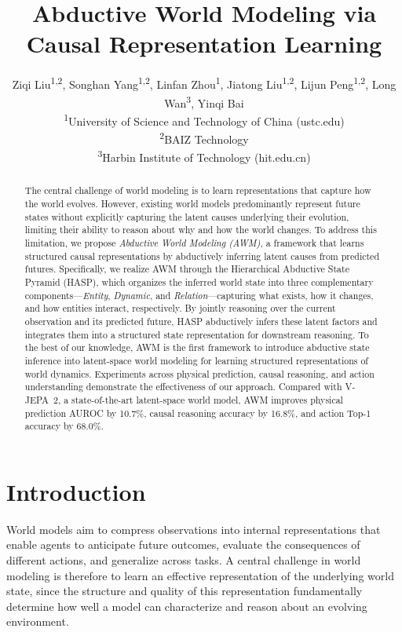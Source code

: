 \documentclass{article}
\title{Abductive World Modeling via Causal Representation Learning}
\author{%
  Ziqi Liu\textsuperscript{1,2},
  Songhan Yang\textsuperscript{1,2},
  Linfan Zhou\textsuperscript{1},
  Jiatong Liu\textsuperscript{1,2},
  Lijun Peng\textsuperscript{1,2},
  Long Wan\textsuperscript{3},
  Yinqi Bai\\[2pt]
  \normalfont\small\textsuperscript{1}University of Science and Technology of China (ustc.edu)\\
  \normalfont\small\textsuperscript{2}BAIZ Technology\\
  \normalfont\small\textsuperscript{3}Harbin Institute of Technology (hit.edu.cn)
}
\newcommand{\vjepa}{V-JEPA~2}
\begin{document}
\maketitle

\begin{abstract}
The central challenge of world modeling is to learn representations that capture how the world evolves. However, existing world models predominantly represent future states without explicitly capturing the latent causes underlying their evolution, limiting their ability to reason about why and how the world changes. 
To address this limitation, we propose \textit{Abductive World Modeling (AWM)}, a framework that learns structured causal representations by abductively inferring latent causes from predicted futures.
Specifically, we realize AWM through the Hierarchical Abductive State Pyramid (HASP), which organizes the inferred world state into three complementary components---\textit{Entity}, \textit{Dynamic}, and \textit{Relation}---capturing what exists, how it changes, and how entities interact, respectively.
By jointly reasoning over the current observation and its predicted future, HASP abductively infers these latent factors and integrates them into a structured state representation for downstream reasoning.
To the best of our knowledge, AWM is the first framework to introduce abductive state inference into latent-space world modeling for learning structured representations of world dynamics. Experiments across physical prediction, causal reasoning, and action understanding demonstrate the effectiveness of our approach. Compared with \vjepa{}, a state-of-the-art latent-space world model, AWM improves physical prediction AUROC by 10.7\%, causal reasoning accuracy by 16.8\%, and action Top-1 accuracy by 68.0\%.
\end{abstract}

\section{Introduction}

World models aim to compress observations into internal representations that enable agents to anticipate future outcomes, evaluate the consequences of different actions, and generalize across tasks\citep{ha2018worldmodels,hafner2019planet,hafner2020dreamer,
hafner2023dreamerv3,assran2025vjepa2}.
A central challenge in world modeling is therefore to learn an effective representation of the underlying world state, since the structure and quality of this representation fundamentally determine how well a model can characterize and reason about an evolving environment.
\end{document}
